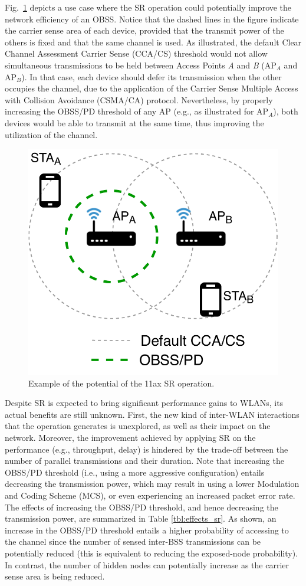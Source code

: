 \documentclass{article}
\begin{document}
	Fig.~\ref{fig:example_sr} depicts a use case where the SR operation could potentially improve the network efficiency of an OBSS. Notice that the dashed lines in the figure indicate the carrier sense area of each device, provided that the transmit power of the others is fixed and that the same channel is used. As illustrated, the default Clear Channel Assessment Carrier Sense (CCA/CS) threshold would not allow simultaneous transmissions to be held between Access Points \textit{A} and \textit{B} (AP$_A$ and AP$_B$). In that case, each device should defer its transmission when the other occupies the channel, due to the application of the Carrier Sense Multiple Access with Collision Avoidance (CSMA/CA) protocol. Nevertheless, by properly increasing the OBSS/PD threshold of any AP (e.g., as illustrated for AP$_A$), both devices would be able to transmit at the same time, thus improving the utilization of the channel.
	\begin{figure}[ht!]
		\centering
		\includegraphics[width=0.4\columnwidth]{fig_1}
		\caption{Example of the potential of the 11ax SR operation.}
		\label{fig:example_sr}
	\end{figure}
	
	Despite SR is expected to bring significant performance gains to WLANs, its actual benefits are still unknown. First, the new kind of inter-WLAN interactions that the operation generates is unexplored, as well as their impact on the network. Moreover, the improvement achieved by applying SR on the performance (e.g., throughput, delay) is hindered by the trade-off between the number of parallel transmissions and their duration. Note that increasing the OBSS/PD threshold (i.e., using a more aggressive configuration) entails decreasing the transmission power, which may result in using a lower Modulation and Coding Scheme (MCS), or even experiencing an increased packet error rate. The effects of increasing the OBSS/PD threshold, and hence decreasing the transmission power, are summarized in Table \ref{tbl:effects_sr}. As shown, an increase in the OBSS/PD threshold entails a higher probability of accessing to the channel since the number of sensed inter-BSS transmissions can be potentially reduced (this is equivalent to reducing the exposed-node probability). In contrast, the number of hidden nodes can potentially increase as the carrier sense area is being reduced.
	
\end{document}
